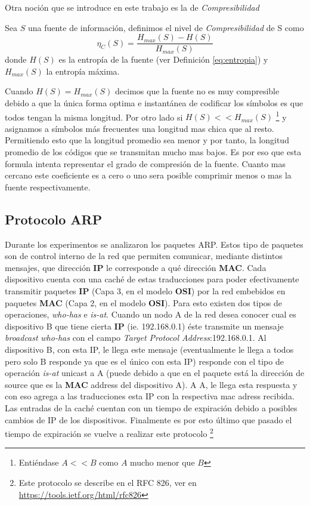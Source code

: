 Otra noción que se introduce en este trabajo es la de \textit{Compresibilidad}
\begin{definicion}
Sea $S$ una fuente de información, definimos el nivel de \textit{Compresibilidad} de S como
\begin{equation} \label{eq:eta_c}
	\eta_{C}(S)=\frac{H_{max}(S) - H(S)}{H_{max}(S)}
	\end{equation}donde $H(S)$ es la entropía de la
	fuente (ver Definición \ref{eq:entropia}) y $H_{max}(S)$ la entropía máxima.
\end{definicion}

Cuando $H(S) = H_{max}(S)$ decimos que
la fuente no es muy compresible debido a que la única forma optima e instantánea
de codificar los símbolos es que todos tengan la misma longitud. Por otro lado
si $H(S) << H_{max}(S)$ \footnote{Entiéndase $A << B$ como $A$ mucho menor que $B$} y asignamos a símbolos más frecuentes
una longitud mas chica que al resto. Permitiendo esto que la longitud promedio
sea menor y por tanto, la longitud promedio de los códigos que se transmitan
mucho mas bajos.
Es por eso que esta formula intenta representar el grado de compresión de la fuente.
Cuanto mas cercano este coeficiente es a cero o uno sera posible comprimir menos
o mas la fuente respectivamente.

\subsection{Protocolo ARP}
Durante los experimentos se analizaron los paquetes ARP. Estos tipo de paquetes
son de control interno de la red que permiten comunicar, mediante distintos mensajes,
que dirección \textbf{IP} le corresponde a qué dirección \textbf{MAC}. Cada dispositivo
cuenta con una caché de estas traducciones para poder efectivamente
transmitir paquetes \textbf{IP} (Capa 3, en el modelo \textbf{OSI}) por la red embebidos
en paquetes \textbf{MAC} (Capa 2, en el modelo \textbf{OSI}). Para esto existen
dos tipos de operaciones, \textit{who-has} e \textit{is-at}. Cuando un nodo A
de la red desea conocer cual es dispositivo B que tiene cierta \textbf{IP} (ie. 192.168.0.1)
éste transmite un mensaje \textit{broadcast} \textit{who-has} con el campo \emph{Target Protocol Address}:192.168.0.1.
Al dispositivo B, con esta IP, le llega este mensaje (eventualmente le llega a todos pero solo B responde ya que es el único con esta IP)
responde con el tipo de operación \textit{is-at} unicast a A (puede debido a que en el paquete está la dirección de source
que es la \textbf{MAC} address del dispositivo A). A A, le llega esta respuesta y con eso agrega a las traducciones esta IP con la respectiva mac adress
recibida. Las entradas de la caché cuentan con un tiempo de expiración debido a posibles cambios de IP de los dispositivos. Finalmente
es por esto último que pasado el tiempo de expiración se vuelve a realizar este protocolo \footnote{Este protocolo se describe en el RFC 826, ver en \url{https://tools.ietf.org/html/rfc826}}

